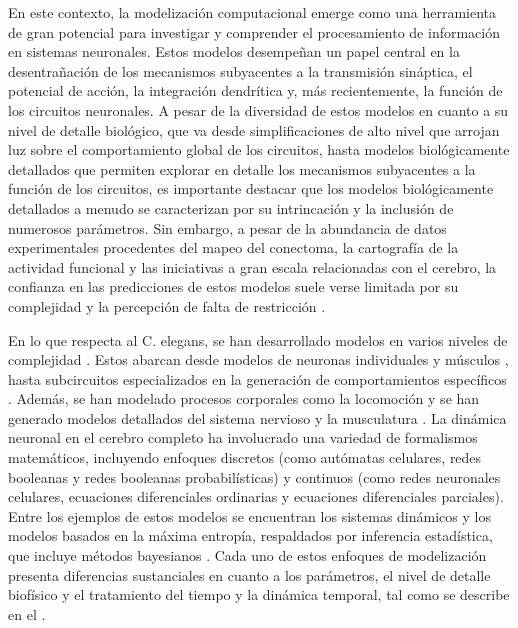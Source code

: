 En este contexto, la modelización computacional emerge como una herramienta de gran potencial para investigar y comprender el procesamiento de información en sistemas neuronales. Estos modelos desempeñan un papel central en la desentrañación de los mecanismos subyacentes a la transmisión sináptica, el potencial de acción, la integración dendrítica y, más recientemente, la función de los circuitos neuronales. A pesar de la diversidad de estos modelos en cuanto a su nivel de detalle biológico, que va desde simplificaciones de alto nivel que arrojan luz sobre el comportamiento global de los circuitos, hasta modelos biológicamente detallados que permiten explorar en detalle los mecanismos subyacentes a la función de los circuitos, es importante destacar que los modelos biológicamente detallados a menudo se caracterizan por su intrincación y la inclusión de numerosos parámetros. Sin embargo, a pesar de la abundancia de datos experimentales procedentes del mapeo del conectoma, la cartografía de la actividad funcional y las iniciativas a gran escala relacionadas con el cerebro, la confianza en las predicciones de estos modelos suele verse limitada por su complejidad y la percepción de falta de restricción \cite{gleeson_open_2019}.



En lo que respecta al C. elegans, se han desarrollado modelos en varios niveles de complejidad \cite{gleeson_c302_2018}. Estos abarcan desde modelos de neuronas individuales \cite{kuramochi_computational_2017} y músculos \cite{boyle_caenorhabditis_2008}, hasta subcircuitos especializados en la generación de comportamientos específicos \cite{roberts_stochastic_nodate}. Además, se han modelado procesos corporales como la locomoción \cite{izquierdo_integrated_2015} y se han generado modelos detallados del sistema nervioso y la musculatura \cite{palyanov_towards_2012}. La dinámica neuronal en el cerebro completo ha involucrado una variedad de formalismos matemáticos, incluyendo enfoques discretos (como autómatas celulares, redes booleanas y redes booleanas probabilísticas) y continuos (como redes neuronales celulares, ecuaciones diferenciales ordinarias y ecuaciones diferenciales parciales). Entre los ejemplos de estos modelos se encuentran los sistemas dinámicos y los modelos basados en la máxima entropía, respaldados por inferencia estadística, que incluye métodos bayesianos \cite{randi_measuring_2020}. Cada uno de estos enfoques de modelización presenta diferencias sustanciales en cuanto a los parámetros, el nivel de detalle biofísico y el tratamiento del tiempo y la dinámica temporal, tal como se describe en el .



